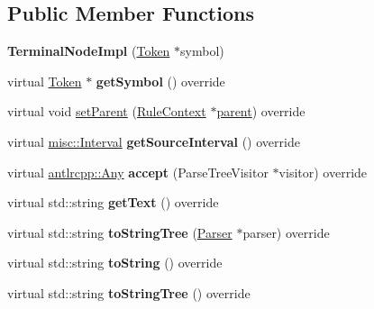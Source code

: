 \subsection*{Public Member Functions}
\begin{DoxyCompactItemize}
\item 
\mbox{\label{classantlr4_1_1tree_1_1TerminalNodeImpl_afff209ec5d4ddf4b35faab89cb5ca23d}} 
{\bfseries Terminal\+Node\+Impl} (\hyperlink{classantlr4_1_1Token}{Token} $\ast$symbol)
\item 
\mbox{\label{classantlr4_1_1tree_1_1TerminalNodeImpl_a3fab300e33e2135a0e224c05cd6cef87}} 
virtual \hyperlink{classantlr4_1_1Token}{Token} $\ast$ {\bfseries get\+Symbol} () override
\item 
virtual void \hyperlink{classantlr4_1_1tree_1_1TerminalNodeImpl_a4043200d8cd1c741ca2f63ac173d30a0}{set\+Parent} (\hyperlink{classantlr4_1_1RuleContext}{Rule\+Context} $\ast$\hyperlink{classantlr4_1_1tree_1_1ParseTree_a83402632670316b68280c04e6be70d50}{parent}) override
\item 
\mbox{\label{classantlr4_1_1tree_1_1TerminalNodeImpl_a1b21f2ddee3bc02f9b242849ce4f1b0f}} 
virtual \hyperlink{classantlr4_1_1misc_1_1Interval}{misc\+::\+Interval} {\bfseries get\+Source\+Interval} () override
\item 
\mbox{\label{classantlr4_1_1tree_1_1TerminalNodeImpl_af7d512026d84403523d39631940af3d3}} 
virtual \hyperlink{structantlrcpp_1_1Any}{antlrcpp\+::\+Any} {\bfseries accept} (Parse\+Tree\+Visitor $\ast$visitor) override
\item 
\mbox{\label{classantlr4_1_1tree_1_1TerminalNodeImpl_ab1a82ffc1a8ce0d927baec060f4a3098}} 
virtual std\+::string {\bfseries get\+Text} () override
\item 
\mbox{\label{classantlr4_1_1tree_1_1TerminalNodeImpl_a0401ce8ef573e7af872e939c52e9ded5}} 
virtual std\+::string {\bfseries to\+String\+Tree} (\hyperlink{classantlr4_1_1Parser}{Parser} $\ast$parser) override
\item 
\mbox{\label{classantlr4_1_1tree_1_1TerminalNodeImpl_a5f9a40cc7b5d8bb9d5fc49ee057845b7}} 
virtual std\+::string {\bfseries to\+String} () override
\item 
\mbox{\label{classantlr4_1_1tree_1_1TerminalNodeImpl_a827e9a0e27e9615d08498289fe875a1a}} 
virtual std\+::string {\bfseries to\+String\+Tree} () override
\end{DoxyCompactItemize}
